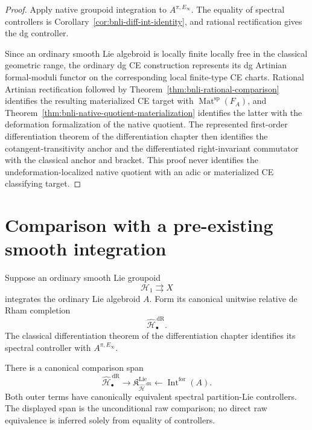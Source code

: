 \begin{proof}
Apply native groupoid integration to \(A^{\pi,E_\infty}\).  The equality of
spectral controllers is Corollary~\ref{cor:bnli-diff-int-identity}, and
rational rectification gives the dg controller.

Since an ordinary smooth Lie algebroid is locally finite locally free in the
classical geometric range, the ordinary dg CE construction represents its dg
Artinian formal-moduli functor on the corresponding local finite-type CE
charts.  Rational Artinian rectification followed by
Theorem~\ref{thm:bnli-rational-comparison} identifies the resulting
materialized CE target with
\(\operatorname{Mat}^{\mathrm{sp}}(F_A)\), and
Theorem~\ref{thm:bnli-native-quotient-materialization} identifies the latter
with the deformation formalization of the native quotient.  The represented
first-order differentiation theorem of the differentiation chapter then
identifies the cotangent-transitivity anchor and the differentiated
right-invariant commutator with the classical anchor and bracket.  This proof never identifies the undeformation-localized native quotient with an
adic or materialized CE classifying target.
\end{proof}

\section{Comparison with a pre-existing smooth integration}
\label{sec:bnli-classical-smooth-comparison}

Suppose an ordinary smooth Lie groupoid
\[
    \mathcal H_1\rightrightarrows X
\]
integrates the ordinary Lie algebroid \(A\).  Form its canonical unitwise
relative de Rham completion
\[
    \widehat{\mathcal H}^{\,\mathrm{dR}}_\bullet.
\]
The classical differentiation theorem of the differentiation chapter
identifies its spectral controller with \(A^{\pi,E_\infty}\).

\begin{theorem}
\label{thm:bnli-smooth-integration-comparison}
There is a canonical comparison span
\[
\boxed{
    \widehat{\mathcal H}^{\,\mathrm{dR}}_\bullet
    \longrightarrow
    \mathfrak K^{\mathrm{Lie}}_{\widehat{\mathcal H}^{\,\mathrm{dR}}}
    \longleftarrow
    \operatorname{Int}^{\mathrm{for}}(A).}
\]
Both outer terms have canonically equivalent spectral partition-Lie
controllers.  The displayed span is the unconditional raw comparison; no
direct raw equivalence is inferred solely from equality of controllers.
\end{theorem}

